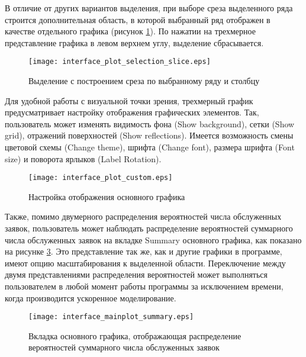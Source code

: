 В отличие от других вариантов выделения, при выборе среза выделенного ряда строится дополнительная область, в которой выбранный ряд отображен в качестве отдельного графика (рисунок \ref{interface_plot_selection_slice}). По нажатии на трехмерное представление графика в левом верхнем углу, выделение сбрасывается.
\begin{figure}[H]
	\centering
	\texttt{[image: interface\_plot\_selection\_slice.eps]}
	\caption{Выделение с построением среза по выбранному ряду и столбцу}
	\label{interface_plot_selection_slice}
\end{figure}
Для удобной работы с визуальной точки зрения, трехмерный график предусматривает настройку отображения графических элементов. Так, пользователь может изменять видимость фона (Show background), сетки (Show grid), отражений поверхностей (Show reflections). Имеется возможность смены  цветовой схемы (Change theme), шрифта (Change font), размера шрифта (Font size) и поворота ярлыков (Label Rotation). 

\begin{figure}[H]
	\centering
	\texttt{[image: interface\_plot\_custom.eps]}
	\caption{Настройка отображения основного графика}
	\label{interface_plot_custom}
\end{figure}

Также, помимо двумерного распределения вероятностей числа обслуженных заявок, пользователь может наблюдать распределение вероятностей суммарного числа обслуженных заявок на вкладке Summary основного графика, как показано на рисунке \ref{interface_mainplot_summary}. Это представление так же, как и другие графики в программе, имеют опцию масштабирования к выделенной области. Переключение между двумя представлениями распределения вероятностей может выполняться пользователем в любой момент работы программы за исключением времени, когда производится ускоренное моделирование. 
\begin{figure}[H]
	\centering
	\texttt{[image: interface\_mainplot\_summary.eps]}
	\caption{Вкладка основного графика, отображающая распределение вероятностей суммарного числа обслуженных заявок}
	\label{interface_mainplot_summary}
\end{figure}
